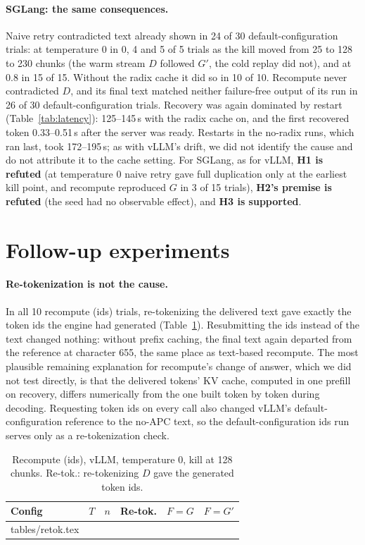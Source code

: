 \documentclass[10pt,twocolumn]{article}
\makeatletter
\def\RetokRows{\@@input tables/retok.tex }
\makeatother
\begin{document}
\paragraph{SGLang: the same consequences.} Naive retry contradicted text
already shown in 24 of 30 default-configuration trials: at temperature 0 in
0, 4 and 5 of 5 trials as the kill moved from 25 to 128 to 230 chunks
(the warm stream $D$ followed $G'$, the cold replay did not), and at 0.8 in
15 of 15. Without the radix cache it did so in 10 of 10. Recompute never
contradicted $D$, and its final text matched neither failure-free output of
its run in 26 of 30 default-configuration trials. Recovery was again
dominated by restart (Table~\ref{tab:latency}): 125--145\,s with the radix
cache on, and the first recovered token 0.33--0.51\,s after the server was
ready. Restarts in the no-radix runs, which ran last, took 172--195\,s; as
with vLLM's drift, we did not identify the cause and do not attribute it to
the cache setting.
For SGLang, as for vLLM, \textbf{H1 is refuted} (at temperature 0 naive
retry gave full duplication only at the earliest kill point, and recompute
reproduced $G$ in 3 of 15 trials), \textbf{H2's premise is refuted} (the
seed had no observable effect), and \textbf{H3 is supported}.

\section{Follow-up experiments}
\label{sec:followup}

\paragraph{Re-tokenization is not the cause.} In all 10 recompute (ids)
trials, re-tokenizing the delivered text gave exactly the token ids the
engine had generated (Table~\ref{tab:retok}). Resubmitting the ids instead
of the text changed nothing: without prefix caching, the final text again
departed from the reference at character 655, the same place as text-based
recompute. The most plausible remaining explanation for recompute's change of answer,
which we did not test directly, is that the delivered tokens' KV cache, computed in one prefill on recovery,
differs numerically from the one built token by token during decoding.
Requesting token ids on every call also changed vLLM's default-configuration
reference to the no-APC text, so the default-configuration ids run serves
only as a re-tokenization check.

\begin{table}[h]
\centering\small
\caption{Recompute (ids), vLLM, temperature 0, kill at 128 chunks.
Re-tok.: re-tokenizing $D$ gave the generated token ids.}
\label{tab:retok}
\setlength{\tabcolsep}{4pt}
\begin{tabular}{@{}lccccc@{}}
\toprule
Config & $T$ & $n$ & Re-tok. & $F{=}G$ & $F{=}G'$ \\
\midrule
\RetokRows
\bottomrule
\end{tabular}
\end{table}
\end{document}
